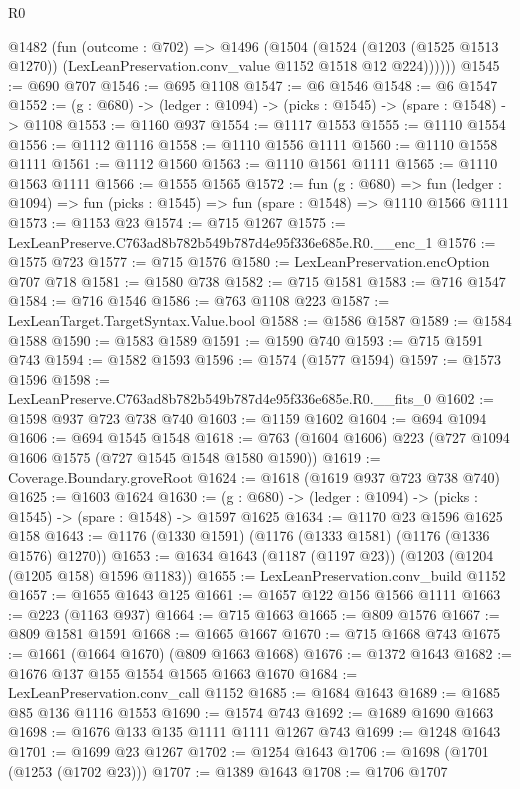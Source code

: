 \begin{lexlean}{R0}
\begin{coremodule}
      @1482
        (fun (outcome : @702) =>
        @1496
          (@1504
            (@1524
              (@1203 (@1525 @1513 @1270))
              (LexLeanPreservation.conv_value @1152 @1518 @12 @224))))))
@1545 := @690 @707
@1546 := @695 @1108
@1547 := @6 @1546
@1548 := @6 @1547
@1552 := (g : @680) -> (ledger : @1094) -> (picks : @1545) -> (spare : @1548) -> @1108
@1553 := @1160 @937
@1554 := @1117 @1553
@1555 := @1110 @1554
@1556 := @1112 @1116
@1558 := @1110 @1556 @1111
@1560 := @1110 @1558 @1111
@1561 := @1112 @1560
@1563 := @1110 @1561 @1111
@1565 := @1110 @1563 @1111
@1566 := @1555 @1565
@1572 := fun (g : @680) =>
  fun (ledger : @1094) => fun (picks : @1545) => fun (spare : @1548) => @1110 @1566 @1111
@1573 := @1153 @23
@1574 := @715 @1267
@1575 := LexLeanPreserve.C763ad8b782b549b787d4e95f336e685e.R0.__enc_1
@1576 := @1575 @723
@1577 := @715 @1576
@1580 := LexLeanPreservation.encOption @707 @718
@1581 := @1580 @738
@1582 := @715 @1581
@1583 := @716 @1547
@1584 := @716 @1546
@1586 := @763 @1108 @223
@1587 := LexLeanTarget.TargetSyntax.Value.bool
@1588 := @1586 @1587
@1589 := @1584 @1588
@1590 := @1583 @1589
@1591 := @1590 @740
@1593 := @715 @1591 @743
@1594 := @1582 @1593
@1596 := @1574 (@1577 @1594)
@1597 := @1573 @1596
@1598 := LexLeanPreserve.C763ad8b782b549b787d4e95f336e685e.R0.__fits_0
@1602 := @1598 @937 @723 @738 @740
@1603 := @1159 @1602
@1604 := @694 @1094
@1606 := @694 @1545 @1548
@1618 := @763 (@1604 @1606) @223 (@727 @1094 @1606 @1575 (@727 @1545 @1548 @1580 @1590))
@1619 := Coverage.Boundary.groveRoot
@1624 := @1618 (@1619 @937 @723 @738 @740)
@1625 := @1603 @1624
@1630 := (g : @680) -> (ledger : @1094) -> (picks : @1545) -> (spare : @1548) -> @1597 @1625
@1634 := @1170 @23 @1596 @1625 @158
@1643 := @1176 (@1330 @1591) (@1176 (@1333 @1581) (@1176 (@1336 @1576) @1270))
@1653 := @1634 @1643 (@1187 (@1197 @23)) (@1203 (@1204 (@1205 @158) @1596 @1183))
@1655 := LexLeanPreservation.conv_build @1152
@1657 := @1655 @1643 @125
@1661 := @1657 @122 @156 @1566 @1111
@1663 := @223 (@1163 @937)
@1664 := @715 @1663
@1665 := @809 @1576
@1667 := @809 @1581 @1591
@1668 := @1665 @1667
@1670 := @715 @1668 @743
@1675 := @1661 (@1664 @1670) (@809 @1663 @1668)
@1676 := @1372 @1643
@1682 := @1676 @137 @155 @1554 @1565 @1663 @1670
@1684 := LexLeanPreservation.conv_call @1152
@1685 := @1684 @1643
@1689 := @1685 @85 @136 @1116 @1553
@1690 := @1574 @743
@1692 := @1689 @1690 @1663
@1698 := @1676 @133 @135 @1111 @1111 @1267 @743
@1699 := @1248 @1643
@1701 := @1699 @23 @1267
@1702 := @1254 @1643
@1706 := @1698 (@1701 (@1253 (@1702 @23)))
@1707 := @1389 @1643
@1708 := @1706 @1707

\end{coremodule}
\end{lexlean}
